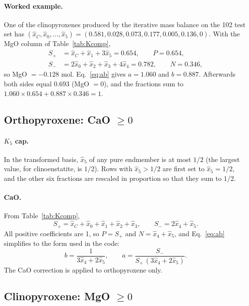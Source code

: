 \documentclass[11pt]{article}
\begin{document}
\paragraph{Worked example.} One of the clinopyroxenes produced by the iterative mass balance
on the 102 test set has
$(\hat x_C, \hat x_0, \dots, \hat x_5) = (0.581, 0.028, 0.073, 0.177, 0.005, 0.136, 0)$.
With the MgO column of Table~\ref{tab:Kcomp},
\begin{align*}
  S_+ &= \hat x_C + \hat x_1 + 3\hat x_5 = 0.654, \qquad P = 0.654,\\
  S_- &= 2\hat x_0 + \hat x_2 + \hat x_3 + 4\hat x_4 = 0.782, \qquad N = 0.346,
\end{align*}
so MgO $= -0.128$ mol. Eq.~\eqref{eq:ab} gives $a = 1.060$ and $b = 0.887$. Afterwards both
sides equal $0.693$ (MgO $= 0$), and the fractions sum to $1.060 \times 0.654 + 0.887 \times
0.346 = 1$.

\subsection{Orthopyroxene: CaO $\ge 0$}

\paragraph{$K_5$ cap.} In the transformed basis, $\hat x_5$ of any pure endmember is at most
$1/2$ (the largest value, for clinoenstatite, is $1/2$). Rows with $\hat x_5 > 1/2$ are
first set to $\hat x_5 = 1/2$, and the other six fractions are rescaled in proportion so
that they sum to $1/2$.

\paragraph{CaO.} From Table~\ref{tab:Kcomp},
\begin{equation}
  S_+ = \hat x_C + \hat x_0 + \hat x_1 + \hat x_2 + \hat x_3, \qquad
  S_- = 2\hat x_4 + \hat x_5 .
\end{equation}
All positive coefficients are 1, so $P = S_+$ and $N = \hat x_4 + \hat x_5$, and
Eq.~\eqref{eq:ab} simplifies to the form used in the code:
\begin{equation}
  b = \frac{1}{3\hat x_4 + 2\hat x_5}, \qquad
  a = \frac{S_-}{S_+\,(3\hat x_4 + 2\hat x_5)} .
\end{equation}
The CaO correction is applied to orthopyroxene only.

\subsection{Clinopyroxene: MgO $\ge 0$}
\end{document}
